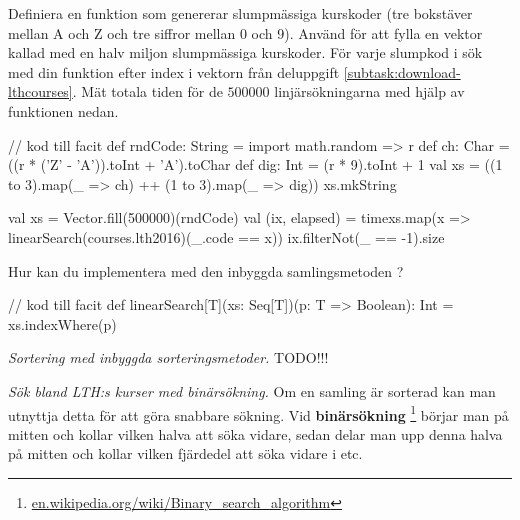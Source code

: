 \Subtask Definiera en funktion  som genererar slumpmässiga kurskoder (tre bokstäver mellan A och Z och tre siffror mellan 0 och 9). Använd  för att fylla en vektor kallad  med en halv miljon slumpmässiga kurskoder. För varje slumpkod i  sök med din funktion  efter index i vektorn  från deluppgift \ref{subtask:download-lthcourses}. Mät totala tiden för de $500000$ linjärsökningarna med hjälp av funktionen  nedan.
 

\begin{Code}
// kod till facit
def rndCode: String = {
  import math.{random => r}
  def ch: Char = ((r * ('Z' - 'A')).toInt + 'A').toChar
  def dig: Int   = (r * 9).toInt + 1
  val xs = ((1 to 3).map(_ => ch) ++ (1 to 3).map(_ => dig))
  xs.mkString
}

val xs = Vector.fill(500000)(rndCode)
val (ix, elapsed) = 
  time{xs.map(x => linearSearch(courses.lth2016)(_.code == x))}
ix.filterNot(_ == -1).size
\end{Code}



\Subtask Hur kan du implementera  med den inbyggda samlingsmetoden ?

\begin{Code}
// kod till facit
def linearSearch[T](xs: Seq[T])(p: T => Boolean): Int = 
  xs.indexWhere(p)
\end{Code}



\Task \emph{Sortering med inbyggda sorteringsmetoder.} TODO!!!

\Subtask \emph{}

\Subtask \emph{}

\Subtask \emph{}




\Task \emph{Sök bland LTH:s kurser med binärsökning.} Om en samling är sorterad kan man utnyttja detta för att göra snabbare sökning. Vid \textbf{binärsökning} \footnote{\href{https://en.wikipedia.org/wiki/Binary_search_algorithm}{en.wikipedia.org/wiki/Binary\_search\_algorithm}} börjar man på mitten och kollar vilken halva att  söka vidare, sedan delar man upp denna halva på mitten och kollar vilken fjärdedel att söka vidare i etc.

